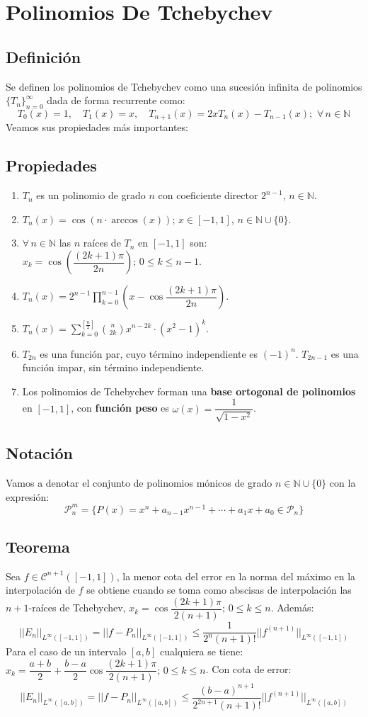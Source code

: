 \documentclass[12pt,a4paper,oneside]{scrbook}
\begin{document}
\section{Polinomios De Tchebychev}
\subsection*{Definición}
Se definen los polinomios de Tchebychev como una sucesión infinita de polinomios $\{T_n\}_{n=0}^\infty$ dada de forma recurrente como:
$$
T_0(x)=1,\quad T_1(x)=x,\quad T_{n+1}(x)=2xT_n(x)-T_{n-1}(x);\,\,\forall\,n\in\mathbb{N}
$$
Veamos sus propiedades más importantes:
\subsection*{Propiedades}
\begin{enumerate}
    \item $T_n$ es un polinomio de grado $n$ con coeficiente director $2^{n-1},\,n\in\mathbb{N}$.
    \item $T_n(x)=\cos (n\cdot\arccos (x));\,x\in [-1,1],\,n\in\mathbb{N}\cup\{0\}$.
    \item $\forall\,n\in\mathbb{N}$ las $n$ raíces de $T_n$ en $[-1,1]$ son: $x_k=\cos \left( \dfrac{(2k+1)\pi}{2n} \right);\,0\leq k\leq n-1$.
    \item $T_n(x)=2^{n-1}\prod\limits_{k=0}^{n-1} \left( x-\cos \dfrac{(2k+1)\pi}{2n} \right)$.
    \item $T_n(x)=\sum\limits_{k=0}^{\left[\frac{n}{2}\right]}\binom{n}{2k}x^{n-2k}\cdot (x^2-1)^k$.
    \item $T_{2n}$ es una función par, cuyo término independiente es $(-1)^n$. $T_{2n-1}$ es una función impar, sin término independiente.
    \item Los polinomios de Tchebychev forman una \textbf{base ortogonal de polinomios} en $[-1,1]$, con \textbf{función peso} es $\omega (x)=\dfrac{1}{\sqrt{1-x^2}}$.
\end{enumerate}
\subsection*{Notación}
Vamos a denotar el conjunto de polinomios mónicos de grado $n\in\mathbb{N}\cup\{0\}$ con la expresión:
$$
\mathcal{P}_n^m=\{ P(x)=x^n+a_{n-1}x^{n-1}+\cdots +a_1x+a_0\in\mathcal{P}_n \}
$$
\subsection*{Teorema}
Sea $f\in\mathcal{C}^{n+1}([-1,1])$, la menor cota del error en la norma del máximo en la interpolación de $f$ se obtiene cuando se toma como abscisas de interpolación las $n+1$-raíces de Tchebychev, $x_k=\cos \dfrac{(2k+1)\pi}{2(n+1)};\,0\leq k\leq n$. Además:
$$
||E_n||_{L^\infty([-1,1])}=||f-P_n||_{L^\infty([-1,1])}\leq\dfrac{1}{2^n(n+1)!}||f^{(n+1)}||_{L^\infty([-1,1])}
$$
Para el caso de un intervalo $[a,b]$ cualquiera se tiene: $x_k=\dfrac{a+b}{2}+\dfrac{b-a}{2}\cos \dfrac{(2k+1)\pi}{2(n+1)};\,0\leq k\leq n$. Con cota de error:
$$
||E_n||_{L^\infty([a,b])}=||f-P_n||_{L^\infty([a,b])}\leq\dfrac{(b-a)^{n+1}}{2^{2n+1}(n+1)!}||f^{(n+1)}||_{L^\infty([a,b])}
$$
\end{document}

